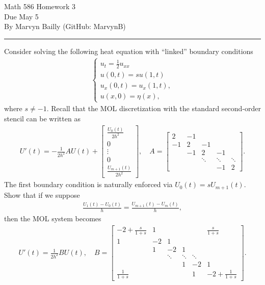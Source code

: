\documentclass[12pt]{report}
\begin{document}
\large

\begin{center}
 Math 586 Homework 3\\
 Due May 5\\
 By Marvyn Bailly (GitHub: MarvynB)\\
\end{center}

\normalsize

\hrule



\begin{problem}
    Consider solving the following heat equation with ``linked'' boundary conditions
  \begin{align*}
    \begin{cases}
        u_t = \frac 1 2 u_{xx}\\
        u(0,t) = s u(1,t)\\
        u_x(0,t) = u_x(1,t),\\
        u(x,0) = \eta(x),
    \end{cases}
    \end{align*}
    where $s \neq -1$.   Recall that the MOL discretization with the standard second-order stencil can be written as
    \begin{align*}
        U'(t) = -\frac{1}{2h^2} A U(t) + \begin{bmatrix} \frac{U_0(t)}{2h^2} \\ 0 \\ \vdots \\ 0 \\ \frac{U_{m+1}(t)}{2h^2} \end{bmatrix}, \quad A = \begin{bmatrix}
        2  & -1\\
        -1 & 2 & -1 \\
        & -1 & 2 & -1\\
        && \ddots & \ddots & \ddots \\
        &&& -1 & 2 \end{bmatrix}.
    \end{align*}
    The first boundary condition is naturally enforced via $U_0(t) = s U_{m+1}(t)$. Show that if we suppose
    \begin{align*}
        \frac{U_{1}(t) - U_0(t)}{h} = \frac{U_{m+1}(t) - U_m(t)}{h},
    \end{align*}
    then the MOL system becomes
    \begin{align}\label{mol}
        U'(t) = \frac{1}{2h^2} B U(t), \quad B = \begin{bmatrix}
        -2 + \frac{s}{1 + s} & 1 &&&& \frac{s}{1 + s}\\
        1 & -2 & 1 \\
        & 1 & -2 & 1 & \\
        &&\ddots & \ddots & \ddots \\
        &&&1 & -2 & 1 \\
        \frac{1}{1+s} &&&& 1 & -2 + \frac{1}{1+s} \end{bmatrix}.
    \end{align}
\end{problem}
\end{document}
